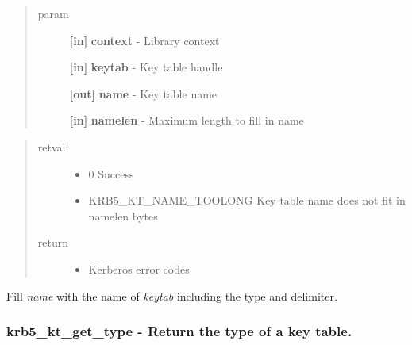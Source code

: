 \documentclass[letterpaper,10pt,english]{sphinxmanual}
\begin{document}
\begin{quote}\begin{description}
\item[{param}] \leavevmode
\textbf{{[}in{]}} \textbf{context} - Library context

\textbf{{[}in{]}} \textbf{keytab} - Key table handle

\textbf{{[}out{]}} \textbf{name} - Key table name

\textbf{{[}in{]}} \textbf{namelen} - Maximum length to fill in name

\end{description}\end{quote}
\begin{quote}\begin{description}
\item[{retval}] \leavevmode\begin{itemize}
\item {} 
0   Success

\item {} 
KRB5\_KT\_NAME\_TOOLONG   Key table name does not fit in namelen bytes

\end{itemize}

\item[{return}] \leavevmode\begin{itemize}
\item {} 
Kerberos error codes

\end{itemize}

\end{description}\end{quote}

Fill \emph{name} with the name of \emph{keytab} including the type and delimiter.


\subsubsection{krb5\_kt\_get\_type -  Return the type of a key table.}
\label{appdev/refs/api/krb5_kt_get_type:krb5-kt-get-type-return-the-type-of-a-key-table}\label{appdev/refs/api/krb5_kt_get_type::doc}

\begin{fulllineitems}
\label{appdev/refs/api/krb5_kt_get_type:c.krb5_kt_get_type}
\end{fulllineitems}
\end{document}
